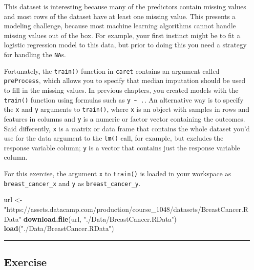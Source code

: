 \documentclass[
]{book}
\newenvironment{Shaded}{\begin{snugshade}}{\end{snugshade}}
\newcommand{\KeywordTok}[1]{\textcolor[rgb]{0.13,0.29,0.53}{\textbf{#1}}}
\newcommand{\NormalTok}[1]{#1}
\newcommand{\StringTok}[1]{\textcolor[rgb]{0.31,0.60,0.02}{#1}}
\begin{document}
This dataset is interesting because many of the predictors contain missing values and most rows of the dataset have at least one missing value. This presents a modeling challenge, because most machine learning algorithms cannot handle missing values out of the box. For example, your first instinct might be to fit a logistic regression model to this data, but prior to doing this you need a strategy for handling the \texttt{NA}s.

Fortunately, the \texttt{train()} function in \texttt{caret} contains an argument called \texttt{preProcess}, which allows you to specify that median imputation should be used to fill in the missing values. In previous chapters, you created models with the \texttt{train()} function using formulas such as \texttt{y\ \textasciitilde{}\ .}. An alternative way is to specify the \texttt{x} and \texttt{y} arguments to \texttt{train()}, where \texttt{x} is an object with samples in rows and features in columns and \texttt{y} is a numeric or factor vector containing the outcomes. Said differently, \texttt{x} is a matrix or data frame that contains the whole dataset you'd use for the data argument to the \texttt{lm()} call, for example, but excludes the response variable column; \texttt{y} is a vector that contains just the response variable column.

For this exercise, the argument \texttt{x} to \texttt{train()} is loaded in your workspace as \texttt{breast\_cancer\_x} and \texttt{y} as \texttt{breast\_cancer\_y}.

\begin{Shaded}
\begin{Highlighting}[]
\NormalTok{url <-}\StringTok{ "https://assets.datacamp.com/production/course_1048/datasets/BreastCancer.RData"}
\KeywordTok{download.file}\NormalTok{(url, }\StringTok{"./Data/BreastCancer.RData"}\NormalTok{)}
\KeywordTok{load}\NormalTok{(}\StringTok{"./Data/BreastCancer.RData"}\NormalTok{)}
\end{Highlighting}
\end{Shaded}

\begin{center}\rule{0.5\linewidth}{0.5pt}\end{center}

\hypertarget{exercise-23}{%
\subsection*{Exercise}\label{exercise-23}}
\end{document}
